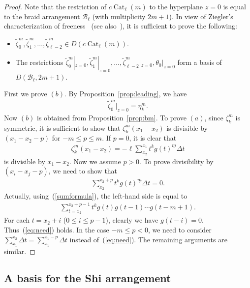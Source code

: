 \documentclass[10pt,a4paper]{amsart}
\numberwithin{equation}{section}
\newcommand{\B}{\mathcal{B}}
\newcommand{\Cat}{\operatorname{Cat}}
\newcommand{\sint}{\sum\nolimits}
\begin{document}
\begin{proof}
Note that the restriction of $c\Cat_\ell(m)$ to the hyperplane $z=0$ is
equal to the braid arrangement $\B_\ell$ (with multiplicity $2m+1$).
In view of Ziegler's characterization of freeness~\cite{zie} (see also~\cite[Corollary~1.35]{yos-survey}), it is sufficient to prove the
following:
\begin{itemize}\itemsep=0pt
\item[$(a)$]
$\widetilde{\zeta}_0^m, \widetilde{\zeta}_1^m, \dots,
\widetilde{\zeta}_{\ell-2}^m\in D(c\Cat_\ell(m))$.
\item[$(b)$]
The restrictions
$\widetilde{\zeta}_0^m|_{z=0}, \widetilde{\zeta}_1^m|_{z=0}, \dots,
\widetilde{\zeta}_{\ell-2}^m|_{z=0}, \theta_0|_{z=0}$
form a basis of $D(\B_\ell, 2m+1)$.
\end{itemize}
First we prove $(b)$. By Proposition~\ref{prop:leading}, we have
\begin{gather*}
\widetilde{\zeta}_0^m|_{z=0}=\eta_k^m.
\end{gather*}
Now $(b)$ is obtained from Proposition~\ref{prop:bm}.
To prove $(a)$, since $\zeta_k^m$ is symmetric, it is sufficient to show that
$\zeta_k^m(x_1-x_2)$ is divisible by $(x_1-x_2-p)$ for $-m\leq p\leq m$.
If $p=0$, it is clear that
\begin{gather*}
\zeta_k^m(x_1-x_2)=
-\ell\sint_{x_2}^{x_1}t^kg(t)^{\underline{m}} \Delta t
\end{gather*}
is divisible by $x_1-x_2$. Now we assume $p>0$. To prove divisibility
by $(x_i-x_j-p)$, we need to show that
\begin{gather}
\label{eq:need}
\sint_{x_2}^{x_2+p}t^kg(t)^{\underline{m}} \Delta t=0.
\end{gather}
Actually, using~(\ref{sumformula}), the left-hand side is equal to
\begin{gather*}
\sum_{t=x_2}^{x_2+p-1}t^kg(t)g(t-1)\cdots g(t-m+1).
\end{gather*}
For each $t=x_2+i$ ($0\leq i\leq p-1$), clearly we have $g(t-i)=0$.
Thus~(\ref{eq:need}) holds.
In the case $-m\leq p<0$, we need to consider
$\sint_{x_1}^{x_2}\Delta t=\sint_{x_1}^{x_1-p}\Delta t$ instead of~(\ref{eq:need}).
The remaining arguments are similar.
\end{proof}

\subsection{A basis for the Shi arrangement}
\end{document}

